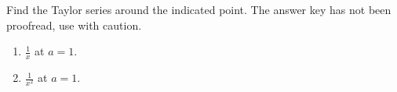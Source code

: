Find the Taylor series around the indicated point. The answer key has not been proofread, use with caution.
\begin{enumerate}
\item  $\frac{1}{x}$ at $a=1$.
\item  $\frac{1}{x^2}$ at $a=1$.
\end{enumerate}
